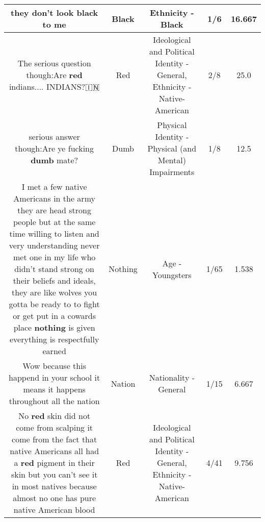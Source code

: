 \documentclass[11pt]{article}
\newlength\mylength
\begin{document}
\begin{center}
\begin{longtable}{|C{.65\mylength}|C{.30\mylength}|C{.12\mylength}|C{.12\mylength}|C{.12\mylength}|}
  \small they don't look \textbf{black} to me\normalsize   & Black & Ethnicity - Black & 1/6 & 16.667 \\  \hline
  \small The serious question though:Are \textbf{r\textbf{ed}} indians.... INDIANS?🇮🇳\normalsize   & Red &  Ideological and Political Identity - General, Ethnicity - Native-American & 2/8 & 25.0 \\  \hline
  \small serious answer though:Are ye fucking \textbf{dumb} mate?\normalsize   & Dumb & Physical Identity - Physical (and Mental) Impairments & 1/8 & 12.5 \\  \hline
  \small I met a few native Americans in the army they are head strong people but at the same time willing to listen and very understanding never met one in my life who didn't stand strong on their beliefs and ideals, they are like wolves you gotta be ready to to fight or get put in a cowards place \textbf{nothing} is given everything is respectfully earned\normalsize   & Nothing & Age - Youngsters & 1/65 & 1.538 \\  \hline
  \small Wow because this happend in your school it means it happens throughout all the nation\normalsize   & Nation & Nationality - General & 1/15 & 6.667 \\  \hline
  \small No \textbf{r\textbf{ed}} skin did not come from scalping it come from the fact that native Americans all had a \textbf{r\textbf{ed}} pigment in their skin but you can't see it in most natives because almost no one has pure native American blood\normalsize   & Red &  Ideological and Political Identity - General, Ethnicity - Native-American & 4/41 & 9.756 \\  \hline

\end{longtable}
\end{center}
\end{document}
